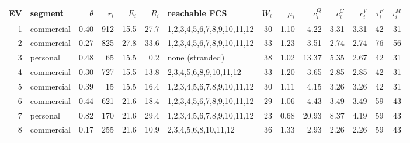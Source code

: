 \footnotesize\begin{adjustbox}{max width=\linewidth}\begin{tabular}{@{}rlrrrrlrrrrrrr@{}}\toprule
EV & segment & $\theta$ & $r_i$ & $E_i$ & $R_i$ & reachable FCS & $W_i$ & $\mu_i$ & $c^Q_i$ & $c^C_i$ & $c^V_i$ & $\tau^F_i$ & $\tau^M_i$ \\\midrule
1 & commercial & 0.40 & 912 & 15.5 & 27.7 & 1,2,3,4,5,6,7,8,9,10,11,12 & 30 & 1.10 & 4.22 & 3.31 & 3.31 & 42 & 31 \\
2 & commercial & 0.27 & 825 & 27.8 & 33.6 & 1,2,3,4,5,6,7,8,9,10,11,12 & 33 & 1.23 & 3.51 & 2.74 & 2.74 & 76 & 56 \\
3 & personal & 0.48 & 65 & 15.5 & 0.2 & none (stranded) & 38 & 1.02 & 13.37 & 5.35 & 2.67 & 42 & 31 \\
4 & commercial & 0.30 & 727 & 15.5 & 13.8 & 2,3,4,5,6,8,9,10,11,12 & 33 & 1.20 & 3.65 & 2.85 & 2.85 & 42 & 31 \\
5 & commercial & 0.39 & 15 & 15.5 & 16.4 & 1,2,3,4,5,6,7,8,9,10,11,12 & 30 & 1.11 & 4.15 & 3.26 & 3.26 & 42 & 31 \\
6 & commercial & 0.44 & 621 & 21.6 & 18.4 & 1,2,3,4,5,6,7,8,9,10,11,12 & 29 & 1.06 & 4.43 & 3.49 & 3.49 & 59 & 43 \\
7 & personal & 0.82 & 170 & 21.6 & 29.4 & 1,2,3,4,5,6,7,8,9,10,11,12 & 23 & 0.68 & 20.93 & 8.37 & 4.19 & 59 & 43 \\
8 & commercial & 0.17 & 255 & 21.6 & 10.9 & 2,3,4,5,6,8,10,11,12 & 36 & 1.33 & 2.93 & 2.26 & 2.26 & 59 & 43 \\
\bottomrule\end{tabular}\end{adjustbox}
